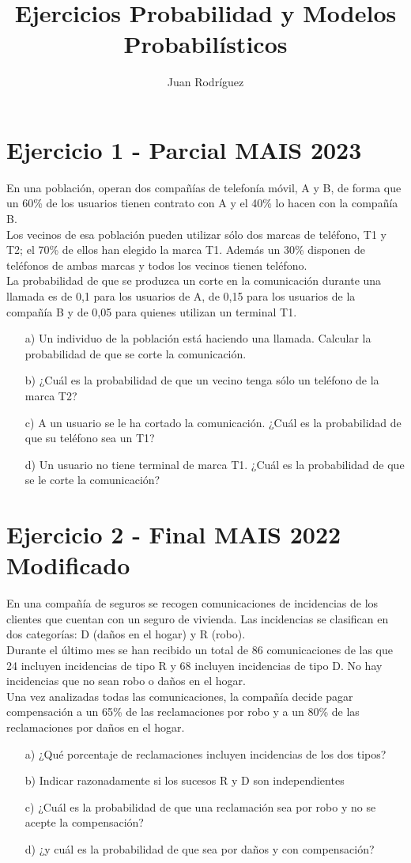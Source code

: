 \documentclass[fleqn]{article}
\title{Ejercicios Probabilidad y Modelos Probabilísticos}
\author{Juan Rodríguez}
\begin{document}
	\maketitle
	\section{Ejercicio 1 - Parcial MAIS 2023}
	En una población, operan dos compañías de telefonía móvil, A y B, de forma que un 60\% de los usuarios tienen contrato con A y el 40\% lo hacen con la compañía B. \\
	Los vecinos de esa población pueden utilizar sólo dos marcas de teléfono, T1 y T2; el 70\% de ellos han elegido la marca T1. Además un 30\% disponen de teléfonos de ambas marcas y todos los vecinos tienen teléfono. \\
	La probabilidad de que se produzca un corte en la comunicación durante una llamada es de 0,1 para los usuarios de A, de 0,15 para los usuarios de la compañía B y de 0,05 para quienes utilizan un terminal T1.
	\begin{enumerate}
		\item[a)] Un individuo de la población está haciendo una llamada. Calcular la probabilidad de que se corte la comunicación.
		\item[b)] ¿Cuál es la probabilidad de que un vecino tenga sólo un teléfono de la marca T2?
		\item[c)] A un usuario se le ha cortado la comunicación. ¿Cuál es la probabilidad de que su teléfono sea un T1?
		\item[d)] Un usuario no tiene terminal de marca T1. ¿Cuál es la probabilidad de que se le corte la comunicación?
	\end{enumerate}
	\section{Ejercicio 2 - Final MAIS 2022 Modificado}
	En una compañía de seguros se recogen comunicaciones de incidencias de los clientes que
	cuentan con un seguro de vivienda. Las incidencias se clasifican en dos categorías: D
	(daños en el hogar) y R (robo). \\
	Durante el último mes se han recibido un total de 86 comunicaciones de las que 24
	incluyen incidencias de tipo R y 68 incluyen incidencias de tipo D. No hay incidencias que
	no sean robo o daños en el hogar. \\
	Una vez analizadas todas las comunicaciones, la compañía decide pagar compensación a
	un 65\% de las reclamaciones por robo y a un 80\% de las reclamaciones por daños en el
	hogar.
	\begin{enumerate}
		\item[a)] ¿Qué porcentaje de reclamaciones incluyen incidencias de los dos tipos?
		\item[b)] Indicar razonadamente si los sucesos R y D son independientes
		\item[c)] ¿Cuál es la probabilidad de que una reclamación sea por robo y no se acepte la compensación?
		\item[d)] ¿y cuál es la probabilidad de que sea por daños y con compensación?
	\end{enumerate}
\end{document}
